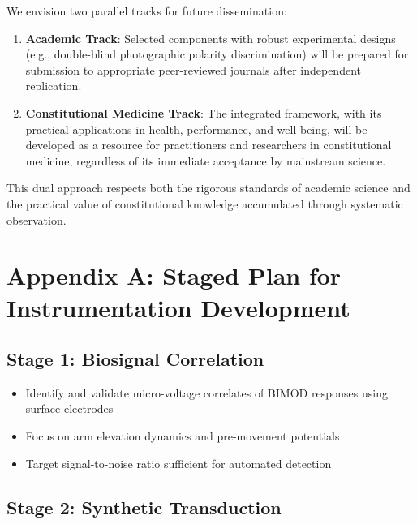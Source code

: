 \documentclass[12pt,a4paper]{article}
\begin{document}
We envision two parallel tracks for future dissemination:

\begin{enumerate}
    \item \textbf{Academic Track}: Selected components with robust experimental designs (e.g., double-blind photographic polarity discrimination) will be prepared for submission to appropriate peer-reviewed journals after independent replication.
    \item \textbf{Constitutional Medicine Track}: The integrated framework, with its practical applications in health, performance, and well-being, will be developed as a resource for practitioners and researchers in constitutional medicine, regardless of its immediate acceptance by mainstream science.
\end{enumerate}

This dual approach respects both the rigorous standards of academic science and the practical value of constitutional knowledge accumulated through systematic observation.


\appendix

\section{Appendix A: Staged Plan for Instrumentation Development}

\subsection{Stage 1: Biosignal Correlation}

\begin{itemize}
    \item Identify and validate micro-voltage correlates of BIMOD responses using surface electrodes
    \item Focus on arm elevation dynamics and pre-movement potentials
    \item Target signal-to-noise ratio sufficient for automated detection
\end{itemize}

\subsection{Stage 2: Synthetic Transduction}
\end{document}
